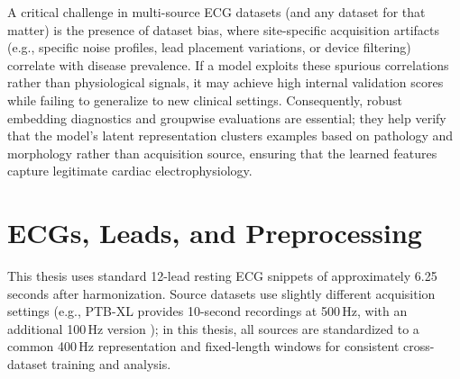 A critical challenge in multi-source ECG datasets (and any dataset for that matter) is the presence of dataset bias, where site-specific acquisition artifacts (e.g., specific noise profiles, lead placement variations, or device filtering) correlate with disease prevalence.
If a model exploits these spurious correlations rather than physiological signals, it may achieve high internal validation scores while failing to generalize to new clinical settings.
Consequently, robust embedding diagnostics and groupwise evaluations are essential; they help verify that the model's latent representation clusters examples based on pathology and morphology rather than acquisition source, ensuring that the learned features capture legitimate cardiac electrophysiology.

\section{ECGs, Leads, and Preprocessing}
This thesis uses standard 12-lead resting ECG snippets of approximately 6.25 seconds after harmonization.
Source datasets use slightly different acquisition settings (e.g., PTB-XL provides 10-second recordings at 500\,Hz, with an additional 100\,Hz version \parencite{wagner_ptb_xl}); in this thesis, all sources are standardized to a common 400\,Hz representation and fixed-length windows for consistent cross-dataset training and analysis.


